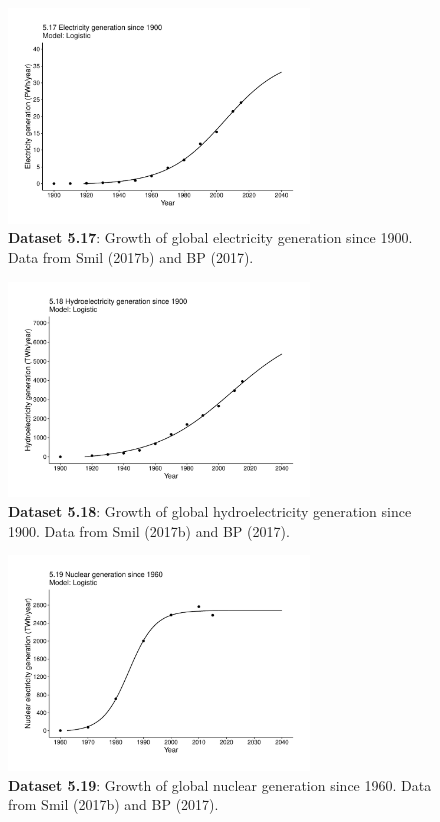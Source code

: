 \documentclass[aps,rmp,preprint,superscriptaddress,10pt,onecolumn]{article}
\begin{document}
\begin{figure}[h]
\includegraphics[width=8cm]{output/figs-ggplot/5.17.pdf}
\caption{\textbf{Dataset 5.17}: Growth of global electricity generation since 1900. Data from Smil (2017b) and BP (2017). }
\end{figure}
	
\begin{figure}[h]
\includegraphics[width=8cm]{output/figs-ggplot/5.18.pdf}
\caption{\textbf{Dataset 5.18}: Growth of global hydroelectricity generation since 1900. Data from Smil (2017b) and BP (2017).}
\end{figure}
	
\begin{figure}[h]
\includegraphics[width=8cm]{output/figs-ggplot/5.19.pdf}
\caption{\textbf{Dataset 5.19}: Growth of global nuclear generation since 1960. Data from Smil (2017b) and BP (2017).}
\end{figure}
	
\end{document}
